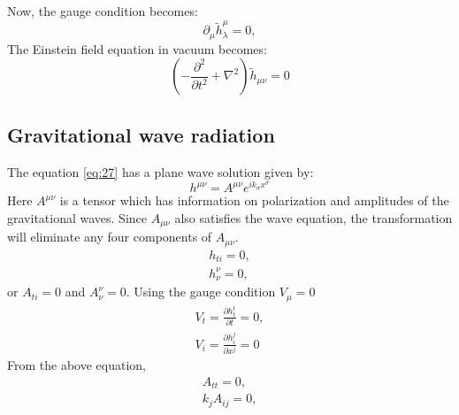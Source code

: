 \documentclass{ttuthes2007}
\begin{document}
Now, the gauge condition becomes:
\begin{equation}\label{eq:28}
\partial _\mu \tilde h^\mu _\lambda = 0,
\end{equation}
The Einstein field equation in vacuum becomes:
\begin{equation}\label{eq:29}
\left(-\frac{\partial^2}{\partial t^2}+\nabla ^2\right)\tilde h_{\mu\nu} =0
\end{equation}


\subsection{Gravitational wave radiation}
The equation \ref{eq:27} has a plane wave solution given by:
\begin{equation} \label{eq:30}
h^{\mu \nu} = A^{\mu \nu}e^{ik_\sigma x^\sigma}
\end{equation}
Here $A^{\mu \nu}$ is a tensor which has information on
polarization and amplitudes of the gravitational waves.
Since $A_{\mu \nu}$ also satisfies the wave equation, the transformation will
eliminate any four components of $A_{\mu \nu}$.
\begin{equation}
\begin{aligned}
h_{ti}=0, \\
h^\nu_\nu =0,
\end{aligned}
\end{equation}
or $A_{ti}=0$ and $A_\nu ^\nu=0$. Using the gauge condition $V_\mu =0$
\begin{equation}
\begin{aligned}
V_t=\frac{\partial h^t _t}{\partial t}=0,\\
V_i=\frac{\partial h^j _i}{\partial x^j}=0
\end{aligned}
\end{equation}
From the above equation,
\begin{equation}                                                                
\begin{aligned} 
A_{tt}=0, \\
k_j A_{ij}=0,
\end{aligned}                                                                   
\end{equation} 
\end{document}
